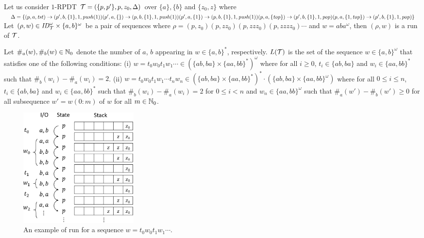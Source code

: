 \begin{example}
\label{ex: PDT}
Let us consider $1$-RPDT
${\cal T} = (\{p,p'\},p,z_0,\Delta)$
over $\{a\},\{b\}$ and $\{z_0,z\}$ where
$\Delta = \{
(p, a, \mathit{tst}) \rightarrow (p', b, \{1\}, 1, \mathit{push}(1))
(p', a, \{\}) \rightarrow (p, b, \{1\}, 1, \mathit{push}(1))
(p', a, \{1\}) \rightarrow (p, b, \{1\}, 1, \mathit{push}(1))
(p, a, \{\mathit{top}\}) \rightarrow (p', b, \{1\}, 1, \mathit{pop})
(p, a, \{1,\mathit{top}\}) \rightarrow (p', b, \{1\}, 1, \mathit{pop})
\}$
Let $(\rho,w)\in \mathit{ID}_{\cal T}^\omega\times \{a,b\}^\omega$
be a pair of sequences where
$\rho=(p,z_0)(p,zz_0)(p,zzz_0)(p,zzzz_0)\cdots$ and $w=aba^\omega$,
then $(\rho,w)$ is a run of ${\cal T}$.

Let $\#_a(w), \#_b(w)\in \mathbb{N}_0$ denote the number of $a$, $b$
appearing in $w\in\{a,b\}^*$, respectively.
$L({\cal T})$ is the set of the sequence $w\in \{a,b\}^\omega$
that satisfies one of the following conditions:
(i) $w = t_0 w_0 t_1 w_1\cdots
\in(\{ab, ba\} \times \{aa, bb\}^*)^\omega$
where for all $i\geq 0$, $t_i\in \{ab, ba\}$ and
$w_i\in \{aa, bb\}^*$ such that
$\#_b(w_i)-\#_a(w_i)=2$.
(ii) $w = t_0 w_0 t_1 w_1\cdots t_n w_n
\in(\{ab, ba\} \times \{aa, bb\}^*)^*\cdot(\{ab, ba\} \times \{aa, bb\}^\omega)$
where for all $0\leq i\leq n$, $t_i\in \{ab, ba\}$ and
$w_i\in \{aa, bb\}^*$ such that
$\#_b(w_i)-\#_a(w_i)=2$ for $0\leq i< n$ and
$w_n\in \{aa, bb\}^\omega$ such that
$\#_a(w')-\#_b(w')\geq 0$
for all subsequence $w'=w(0:m)$ of $w$ for all $m\in\mathbb{N}_0$.
\begin{figure}[t]
  \centering
  \includegraphics[width=6cm]{PDT.png}
  \caption{An example of run for a sequence $w = t_0 w_0 t_1 w_1\cdots$.}
  \label{fig: PDT}
\end{figure}
\end{example}



